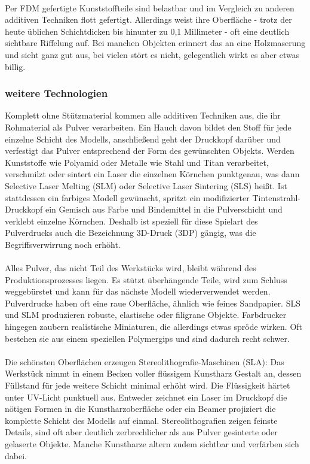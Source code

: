 \\
\noindent
Per FDM gefertigte Kunststoffteile sind belastbar und im Vergleich zu anderen additiven Techniken flott gefertigt. Allerdings weist ihre Oberfläche - trotz der heute üblichen Schichtdicken bis hinunter zu 0,1 Millimeter - oft eine deutlich sichtbare Riffelung auf. Bei manchen Objekten erinnert das an eine Holzmaserung und sieht ganz gut aus, bei vielen stört es nicht, gelegentlich wirkt es aber etwas billig.

\subsubsection{weitere Technologien}
Komplett ohne Stützmaterial kommen alle additiven Techniken aus, die ihr Rohmaterial als Pulver verarbeiten. Ein Hauch davon bildet den Stoff für jede einzelne Schicht des Modells, anschließend geht der Druckkopf darüber und verfestigt das Pulver entsprechend der Form des gewünschten Objekts. Werden Kunststoffe wie Polyamid oder Metalle wie Stahl und Titan verarbeitet, verschmilzt oder sintert ein Laser die einzelnen Körnchen punktgenau, was dann Selective Laser Melting (SLM) oder Selective Laser Sintering (SLS) heißt. Ist stattdessen ein farbiges Modell gewünscht, spritzt ein modifizierter Tintenstrahl-Druckkopf ein Gemisch aus Farbe und Bindemittel in die Pulverschicht und verklebt einzelne Körnchen. Deshalb ist speziell für diese Spielart des Pulverdrucks auch die Bezeichnung 3D-Druck (3DP) gängig, was die Begriffsverwirrung noch erhöht.\\
\\
Alles Pulver, das nicht Teil des Werkstücks wird, bleibt während des Produktionsprozesses liegen. Es stützt überhängende Teile, wird zum Schluss weggebürstet und kann für das nächste Modell wiederverwendet werden. Pulverdrucke haben oft eine raue Oberfläche, ähnlich wie feines Sandpapier. SLS und SLM produzieren robuste, elastische oder filigrane Objekte. Farbdrucker hingegen zaubern realistische Miniaturen, die allerdings etwas spröde wirken. Oft bestehen sie aus einem speziellen Polymergips und sind dadurch recht schwer.\\
\\
Die schönsten Oberflächen erzeugen Stereolithografie-Maschinen (SLA): Das Werkstück nimmt in einem Becken voller flüssigem Kunstharz Gestalt an, dessen Füllstand für jede weitere Schicht minimal erhöht wird. Die Flüssigkeit härtet unter UV-Licht punktuell aus. Entweder zeichnet ein Laser im Druckkopf die nötigen Formen in die Kunstharzoberfläche oder ein Beamer projiziert die komplette Schicht des Modells auf einmal. Stereolithografien zeigen feinste Details, sind oft aber deutlich zerbrechlicher als aus Pulver gesinterte oder gelaserte Objekte. Manche Kunstharze altern zudem sichtbar und verfärben sich dabei.\\
